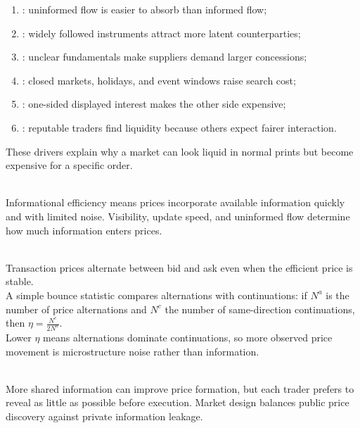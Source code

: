\begin{taxonomy} 
\begin{enumerate}[label=\roman*.]
\setlength{\itemsep}{0pt}
\item {}: uninformed flow is easier to absorb than informed flow;
\item {}: widely followed instruments attract more latent counterparties;
\item {}: unclear fundamentals make suppliers demand larger concessions;
\item {}: closed markets, holidays, and event windows raise search cost;
\item {}: one-sided displayed interest makes the other side expensive;
\item {}: reputable traders find liquidity because others expect fairer interaction.
\end{enumerate}
These drivers explain why a market can look liquid in normal prints but become expensive for a specific order.
\end{taxonomy}

\begin{principle} \\
Informational efficiency means prices incorporate available information quickly and with limited noise. Visibility, update speed, and uninformed flow determine how much information enters prices.
\end{principle}

\begin{mechanism} \\
Transaction prices alternate between bid and ask even when the efficient price is stable.\\
A simple bounce statistic compares alternations with continuations: if $N^a$ is the number of price alternations and $N^c$ the number of same-direction continuations, then $\eta=\frac{N^c}{2N^a}$.\\
Lower $\eta$ means alternations dominate continuations, so more observed price movement is microstructure noise rather than information.
\end{mechanism}

\begin{caveat} \\
More shared information can improve price formation, but each trader prefers to reveal as little as possible before execution. Market design balances public price discovery against private information leakage.
\end{caveat}

